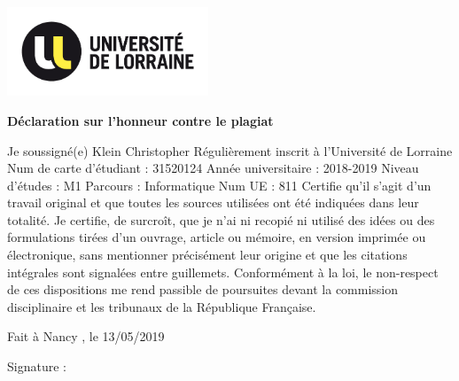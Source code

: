 \documentclass[11pt]{article}
\begin{document}
\cleardoublepage
\begin{flushleft}
\includegraphics[width=6cm]{UL_LOGO.jpg} %
\end{flushleft}

\vspace*{15mm}
\begin{center}
	{\bfseries \huge D\'{e}claration sur l'honneur contre le plagiat}
\end{center}
\vspace*{30mm}
Je soussign\'{e}(e) Klein Christopher
\newline
R\'{e}guli\`{e}rement inscrit \`{a} l'Universit\'{e} de Lorraine
\newline
Num de carte d'\'{e}tudiant : 31520124
\newline
Ann\'{e}e universitaire : 2018-2019
\newline
Niveau d'\'{e}tudes : M1
\newline
Parcours : Informatique
\newline
Num UE : 811
\newline
\newline
Certifie qu'il s'agit d'un travail original et que toutes les sources utilis\'{e}es ont \'{e}t\'{e} indiqu\'{e}es dans leur totalit\'{e}. Je certifie, de surcro\^{i}t, que je n'ai ni recopi\'{e} ni utilis\'{e} des id\'{e}es ou des formulations tir\'{e}es d'un ouvrage, article ou m\'{e}moire, en version imprim\'{e}e ou \'{e}lectronique, sans mentionner pr\'{e}cis\'{e}ment leur origine et que les citations int\'{e}grales sont signal\'{e}es entre guillemets.
\newline
\newline
Conform\'{e}ment \`{a} la loi, le non-respect de ces dispositions me rend passible de poursuites devant la commission disciplinaire et les tribunaux de la R\'{e}publique Fran\c{c}aise.
\vspace*{20mm}
\begin{flushright}
Fait \`{a}  Nancy , le 13/05/2019
\end{flushright}
\vspace*{5mm}
\begin{flushright}
 Signature :  \,\,\,\,\,\,\,\,\,\,\,\,\,\,\,\,\,\,\,\,\,\,\,\,\,\,\,\,\,\,\,\,\,\,\,\,\,\,\,\,\,\,\,\,\,\,
\end{flushright}
\end{document}
